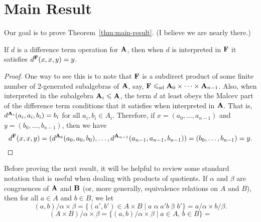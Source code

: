 \section{Main Result}
Our goal is to prove Theorem~\ref{thm:main-result}. 
(I believe we are nearly there.)

\begin{lemma}
  If $d$ is a difference term operation for $\mathbf{A}$,
  then when $d$ is interpreted in $\mathbf{F}$ it satisfies $d^{\mathbf{F}}(x,x,y) = y$.
\end{lemma}
\begin{proof}
One way to see this is to note that $\mathbf{F}$ is a
  subdirect product of some finite number of 2-generated subalgebras of $\mathbf{A}$,
  say, $\mathbf{F} \leqslant_{\mathrm{sd}} \mathbf{A}_0 \times \cdots \times \mathbf{A}_{n-1}$. Also, when interpreted
  in the subalgebra $\mathbf{A}_i \leqslant \mathbf{A}$, the term $d$ at least obeys
  the Malcev part of the difference term conditions that it satisfies when
  interpreted in $\mathbf{A}$.
  That is,   $d^{\mathbf{A}_i}(a_i, a_i, b_i) = b_i$ for all $a_i, b_i \in A_i$.
  Therefore, if $x = (a_0, \dots, a_{n-1})$
  and $y = (b_0, \dots, b_{n-1})$, then we have
  \[
  d^{\mathbf{F}}(x,x,y) = 
  (d^{\mathbf{A}_0}(a_0, a_0, b_0), \dots,d^{\mathbf{A}_{n-1}}(a_{n-1}, a_{n-1}, b_{n-1}))
  = (b_0, \dots, b_{n-1}) = y.\]
\end{proof}

Before proving the next result, it will be helpful to review some standard
notation that is useful when dealing with products of quotients.  If $\alpha$
and $\beta$ are congruences of $\mathbf{A}$ and 
$\mathbf{B}$ (or, more generally, equivalence relations on $A$ and $B$), then
for all $a\in A$ and $b\in B$, we let
\[
(a,b)/\alpha \times \beta = \{(a', b') \in A\times B \mid a\mathrel{\alpha} a'
b\mathrel{\beta} b'\} = a/\alpha \times b/\beta.
\]
\[
(A\times B)/\alpha \times \beta = \{(a, b)/\alpha \times \beta \mid a\in A,\, b \in B\}
 = 
\]


